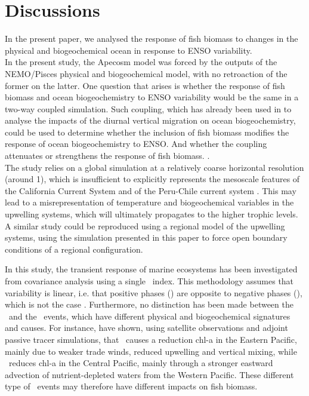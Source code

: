 \section{Discussions}

In the present paper, we analysed the response of fish biomass to changes in the physical and biogeochemical ocean in response to ENSO variability. \\

In the present study, the Apecosm model was forced by the outputs of the NEMO/Pisces physical and biogeochemical model, with no retroaction of the former on the latter. One question that arises is whether the response of fish biomass and ocean biogeochemistry to ENSO variability would be the same in a two-way coupled simulation. 	Such coupling, which has already been used in \cite{aumontEvaluatingPotentialImpacts2018} to analyse the impacts of the diurnal vertical migration on ocean biogeochemistry, could be used to determine whether the inclusion of fish biomass modifies the response of ocean biogeochemistry to ENSO. And whether the coupling attenuates or strengthens the response of fish biomass. . \\

The study relies on a global simulation at a relatively coarse horizontal resolution (around 1\degree), which is insufficient to 
explicitly represents the mesoscale features of the California Current System \citep{capetMesoscaleSubmesoscaleTransition2008} and
of the Peru-Chile current system \citep{colasHeatBalanceEddies2012}. This may lead to a misrepresentation of temperature and biogeochemical variables in the upwelling systems, which will ultimately propagates to the higher trophic levels. A similar study
could be reproduced using a regional model of the upwelling systems, using the simulation presented in this paper to force open boundary conditions of a regional configuration. 

In this study, the transient response of marine ecosystems has been investigated from covariance analysis using a single \nino\ index. This methodology assumes that \enso variability is linear, i.e. that positive \enso phases (\nino) are opposite to negative \enso phases (\nina), which is not the case \citep{okumuraAsymmetryDurationNino2010}. Furthermore, no distinction has been made between the \epn\ and the \cpn\ events, which have different physical and biogeochemical signatures and causes. For instance, \cite{gierachBiologicalResponse19972012} have shown, using satellite observations and adjoint passive tracer simulations, 
that \epn\ causes a reduction chl-a in the Eastern Pacific, mainly due to weaker trade winds, reduced upwelling and vertical mixing, while \cpn\ reduces chl-a in the Central Pacific, mainly through a stronger
eastward advection of nutrient-depleted waters from the Western Pacific. These different type of \nino\ events may therefore have different impacts on fish biomass.

